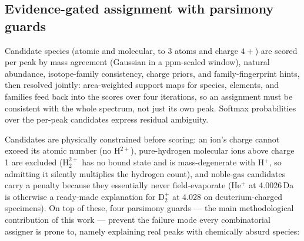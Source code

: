 \documentclass[11pt]{article}
\begin{document}
\subsection{Evidence-gated assignment with parsimony guards}
Candidate species (atomic and molecular, to 3 atoms and charge $4+$) are
scored per peak by mass agreement (Gaussian in a ppm-scaled window),
natural abundance, isotope-family consistency, charge priors, and
family-fingerprint hints, then resolved jointly: area-weighted support
maps for species, elements, and families feed back into the scores over
four iterations, so an assignment must be consistent with the whole
spectrum, not just its own peak. Softmax probabilities over the
per-peak candidates express residual ambiguity.

Candidates are physically constrained before scoring: an ion's charge
cannot exceed its atomic number (no H$^{2+}$), pure-hydrogen molecular
ions above charge 1 are excluded (H$_2^{2+}$ has no bound state and is
mass-degenerate with H$^+$, so admitting it silently multiplies the
hydrogen count), and noble-gas candidates carry a penalty because they
essentially never field-evaporate (He$^+$ at 4.0026\,Da is otherwise a
ready-made explanation for D$_2^+$ at 4.028 on deuterium-charged
specimens). On top of these, four parsimony guards --- the main
methodological contribution of this work --- prevent the failure mode
every combinatorial assigner is prone to, namely explaining real peaks
with chemically absurd species:
\end{document}
